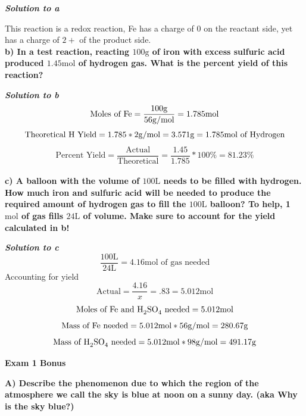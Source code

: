 \documentclass{article}
\begin{document}
    \textbf{\textit{Solution to a}}

    This reaction is a redox reaction, Fe has a charge of 0 on the reactant side, yet has a charge of $2+$ of the product side.\\[1cm]

    \textbf{b) In a test reaction, reacting $100 \si{\gram}$ of iron with excess sulfuric acid produced $1.45 \si{\mole}$ of hydrogen gas. What is the percent yield of this reaction?}

    \textbf{\textit{Solution to b}}
    $$\text{Moles of \ce{Fe}} = \dfrac{100 \si{\gram}}{ 56 \si[per-mode=symbol]{\gram\per\mol}} = 1.785 \si{\mole}$$
    $$\text{Theoretical \ce{H} Yield} = 1.785 * 2 \si[per-mode=symbol]{\gram\per\mol} = 3.571 \si{\gram}  = 1.785 \si{\mole} \text{ of Hydrogen}$$
    $$\text{Percent Yield} = \dfrac{\text{Actual}}{\text{Theoretical}} = \dfrac{1.45}{1.785} * 100\% = 81.23 \%$$\\[1cm]

    \textbf{c) A balloon with the volume of $100 \si{\liter}$ needs to be filled with hydrogen. How much iron and sulfuric acid will be needed to produce the required amount of hydrogen gas to fill the $100 \si{\liter}$ balloon? To help, 1 $\si{\mole}$ of gas fills $24 \si{\liter}$ of volume. \textbf{Make sure to account for the yield calculated in b!}}

    \textbf{\textit{Solution to c}}
    $$\dfrac{100 \si{\liter}}{24 \si{\liter}} = 4.16 \si{\mole} \text{ of gas needed} $$
    Accounting for yield
    $$\text{Actual} = \dfrac{4.16}{x} = .83 = 5.012 \si{\mole} $$
    $$\text{Moles of \ce{Fe} and \ce{H2SO4} needed} = 5.012 \si{\mole} $$
    $$\text{Mass of \ce{Fe} needed} =  5.012 \si{\mole} * 56 \si[per-mode=symbol]{\gram\per\mol} = 280.67 \si{\gram}$$
    $$\text{Mass of \ce{H2SO4} needed} =  5.012 \si{\mole} *   98 \si[per-mode=symbol]{\gram\per\mol} = 491.17 \si{\gram}$$

    \pagebreak

    \begin{center}
        \textbf{Exam 1 Bonus}\\
    \end{center}

    \textbf{A) Describe the phenomenon due to which the region of the atmosphere we call the sky is blue at noon on a sunny day. (aka Why is the sky blue?)}
\end{document}
